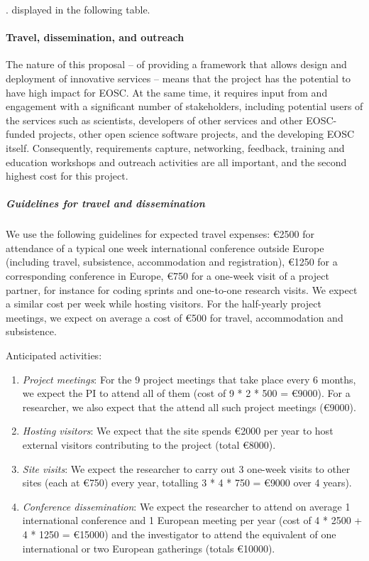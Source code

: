 \ifgrantagreement.\else{} %
displayed in the following table.
\wpfig[label=fig:staffeffort,caption=Summary of Staff Efforts]
\fi

\paragraph{Travel, dissemination, and outreach}

The nature of this proposal -- of providing a framework that allows
design and deployment of innovative services -- means that the project
has the potential to have high impact for EOSC. At the same time, it
requires input from and engagement with a significant number of
stakeholders, including potential users of the services such as
scientists, developers of other services and other EOSC-funded
projects, other open science software projects, and the developing
EOSC itself. Consequently, requirements capture, networking, feedback,
training and education workshops and outreach activities are all
important, and the second highest cost for this project.

\subparagraph{Guidelines for travel and dissemination}
\label{sect:budget-details-travel}

We use the following guidelines for expected travel expenses:
\euro{2500} for attendance of a typical one week international
conference outside Europe (including travel, subsistence,
accommodation and registration), \euro{1250} for a corresponding
conference in Europe, \euro{750} for a one-week visit of a project
partner, for instance for coding sprints and one-to-one
research visits. We expect a similar cost per week while hosting
visitors. For the half-yearly project meetings, we expect on average a
cost of \euro{500} for travel, accommodation and subsistence.

Anticipated activities:

\begin{enumerate}
\item \emph{Project meetings}: For the 9 project meetings that take place every 6 months, we expect
the PI to attend all of them (cost of 9 * 2 * 500 = \euro{9000}). For
a researcher, we also expect that the attend all such project meetings
(\euro{9000}).

\item \emph{Hosting visitors}: We expect that the site spends \euro{2000} per year to host
external visitors contributing to the project (total \euro{8000}).

\item \emph{Site visits}: We expect the researcher to carry out 3 one-week visits to other sites
(each at \euro{750}) every year, totalling 3 * 4 * 750 = \euro{9000}
over 4 years).

\item
\emph{ Conference dissemination}: We expect the researcher to attend on average 1
international conference and 1 European meeting per year (cost of 4 *
2500 + 4 * 1250 = \euro{15000}) and the investigator to attend the
equivalent of one international or two
European gatherings (totals \euro{10000}).
\end{enumerate}

